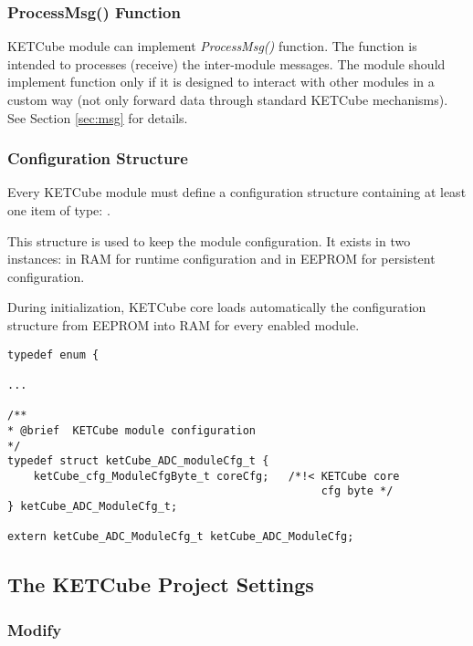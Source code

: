 \subsubsection*{ProcessMsg() Function}
KETCube module can implement {\it ProcessMsg()} function. The function is intended to processes (receive) the inter-module messages. The module should implement  function only if it is designed to interact with other modules in a custom way (not only forward data through standard KETCube mechanisms). See Section \ref{sec:msg} for details.

\subsubsection*{Configuration Structure}
Every KETCube module must define a configuration structure containing at least one item of type: .

This structure is used to keep the module configuration. It exists in two instances: in RAM for runtime configuration and in EEPROM for persistent configuration. 

During initialization, KETCube core loads automatically the configuration structure from EEPROM into RAM for every enabled module.

\begin{docCodeExample}
\begin{verbatim}
typedef enum {

...

/**
* @brief  KETCube module configuration
*/
typedef struct ketCube_ADC_moduleCfg_t {
    ketCube_cfg_ModuleCfgByte_t coreCfg;   /*!< KETCube core 
                                                cfg byte */
} ketCube_ADC_ModuleCfg_t;

extern ketCube_ADC_ModuleCfg_t ketCube_ADC_ModuleCfg;
\end{verbatim}
\end{docCodeExample}

\clearpage
\subsection{The KETCube Project Settings}\label{sec:creation:core}

\subsubsection*{Modify }\label{sec:creation:core:cfg}

